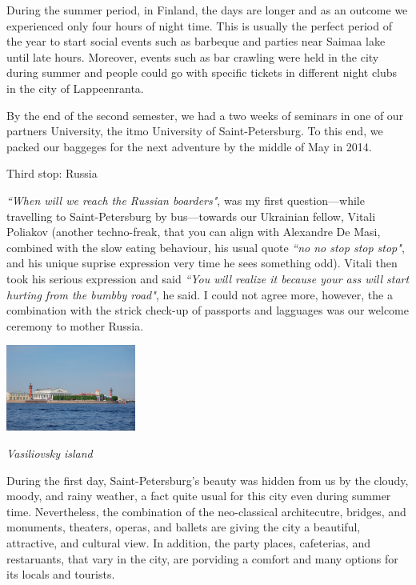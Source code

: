 \documentclass[10pt,a4paper]{article} %
\newcommand{\NewsItem}[1]{ %
\usefont{T1}{fvs}{n}{n} %
\vspace{24pt}\large #1\vspace{3pt} %
\par \normalsize \normalfont}
\begin{document}
\begin{multicols}{3}
During the summer period, in Finland, the days are longer and as an outcome we 
experienced only four hours of night time. 
This is usually the perfect period of the year to start social events such as 
barbeque and parties near Saimaa lake until late hours. 
Moreover, events such as bar crawling were held in the city during summer and people 
could go with specific tickets in different night clubs in the city of Lappeenranta.


By the end of the second semester, we had a two weeks of seminars in one of our 
partners University, the {\sc itmo} University of Saint-Petersburg. 
To this end, we packed our baggeges for the next adventure by the middle of May 
in 2014.	

\NewsItem{Third stop: Russia}
%  
\textit{``When will we reach the Russian boarders"}, was my first question---while 
travelling to Saint-Petersburg by bus---towards our Ukrainian fellow, Vitali Poliakov 
(another techno-freak, that you can align with Alexandre De Masi, combined with 
the slow eating behaviour, his usual quote \textit{``no no stop stop stop"}, and  
his unique suprise expression very time he sees something odd). 
Vitali then took his serious expression and said \textit{``You will realize it 
	because your ass will start hurting from the bumbby road"}, he said. 
I could not agree more, however, the a combination with the strick check-up of 
passports and lagguages was our welcome ceremony to mother Russia.


\begin{center}
	\includegraphics[width=0.32\textwidth]{media/spb_1.jpg}
	\par\textit{Vasiliovsky island}
\end{center}


During the first day, Saint-Petersburg's beauty was hidden from us by the cloudy, 
moody, and rainy weather, a fact quite usual for this city even during summer time.  
Nevertheless, the combination of the neo-classical architecutre, bridges, and 
monuments, theaters, operas, and ballets are giving the city a beautiful, attractive, 
and cultural view. 
In addition, the party places, cafeterias, and restaruants, that vary in the 
city, are porviding a comfort and many options for its locals and tourists. 



\end{multicols}
\end{document}
